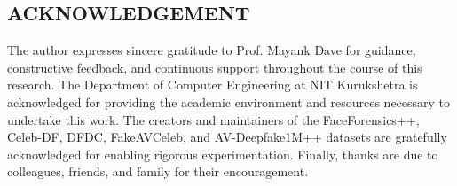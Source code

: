 \begin{center}
	\section*{ACKNOWLEDGEMENT}
	\noindent{\rule{\textwidth}{1.5pt}}
\end{center}
The author expresses sincere gratitude to Prof. Mayank Dave for guidance, constructive feedback, and continuous support throughout the course of this research. The Department of Computer Engineering at NIT Kurukshetra is acknowledged for providing the academic environment and resources necessary to undertake this work. The creators and maintainers of the FaceForensics++, Celeb-DF, DFDC, FakeAVCeleb, and AV-Deepfake1M++ datasets are gratefully acknowledged for enabling rigorous experimentation. Finally, thanks are due to colleagues, friends, and family for their encouragement.